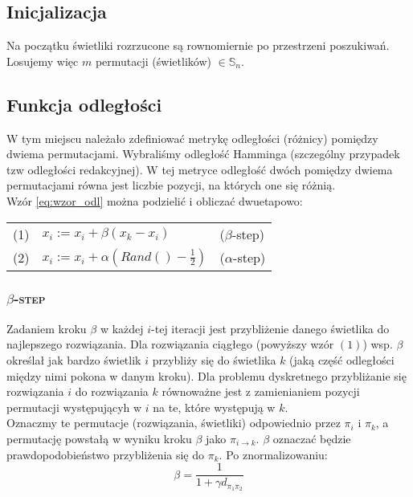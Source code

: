 \documentclass[12pt]{article}
\begin{document}
  \subsection{Inicjalizacja}
  Na początku świetliki rozrzucone są rownomiernie po przestrzeni poszukiwań. Losujemy więc $m$ permutacji (świetlików)  $\in \mathbb{S}_n$.
  \subsection{Funkcja odległości}
  W tym miejscu należało zdefiniować metrykę odległości (różnicy) pomiędzy dwiema permutacjami. Wybraliśmy odległość Hamminga (szczególny przypadek tzw odległości redakcyjnej). W tej metryce odległość dwóch pomiędzy dwiema permutacjami równa jest liczbie pozycji, na których one się różnią. \\
  Wzór \eqref{eq:wzor_odl} można podzielić i obliczać dwuetapowo:
  
\begin{tabular}{p{30pt} p{200pt} p{1000pt}}
(1) &  $x_i := x_i + \beta(x_k - x_i) $ & ($\beta$-step) \\
(2) & $x_i := x_i + \alpha \left( Rand() - \frac{1}{2} \right)$  & ($\alpha$-step) \\
\end{tabular}

\subsubsection{\textsc{$\beta$-step}}
Zadaniem kroku $\beta$ w każdej $i$-tej iteracji jest przybliżenie danego świetlika do najlepszego rozwiązania.
Dla rozwiązania ciągłego (powyższy wzór $(1)$) wsp. $\beta$ określał jak bardzo świetlik $i$ przybliży się do świetlika $k$ (jaką część odległości między nimi pokona w danym kroku). Dla problemu dyskretnego przybliżanie się rozwiązania $i$ do rozwiązania $k$ równoważne jest z zamienianiem pozycji permutacji występującyh w $i$ na te, które występują w $k$. \\
Oznaczmy te permutacje (rozwiązania, świetliki) odpowiednio przez $\pi_i$ i $\pi_k$, a permutację powstałą w wyniku kroku $\beta$ jako $\pi_{i\rightarrow k}$. $\beta$ oznaczać będzie prawdopodobieństwo przybliżenia się do $\pi_k$. Po znormalizowaniu:
\begin{equation}
\beta = \frac{1}{1 + \gamma d_{\pi_1 \pi_2}}
\end{equation}
\end{document}
